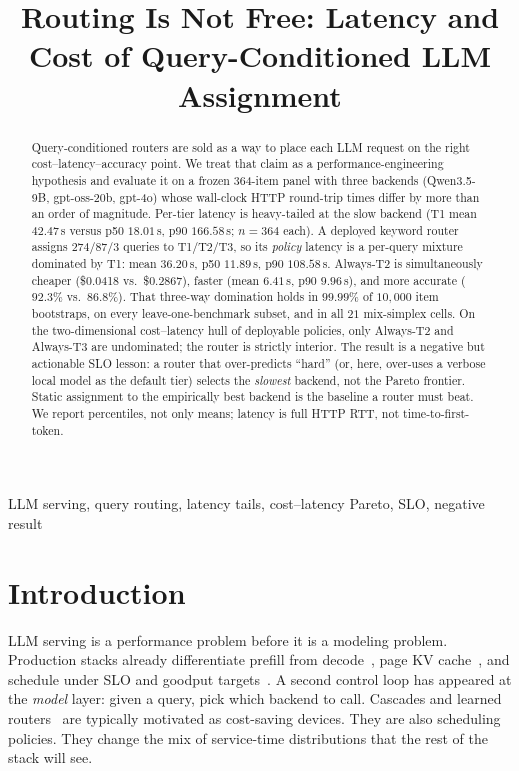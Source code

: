 \documentclass[10pt,conference]{IEEEtran}
\begin{document}
\title{Routing Is Not Free: Latency and Cost of Query-Conditioned LLM Assignment}

\author{
}

\maketitle

\begin{abstract}
Query-conditioned routers are sold as a way to place each LLM request on the right cost--latency--accuracy point. We treat that claim as a performance-engineering hypothesis and evaluate it on a frozen 364-item panel with three backends (Qwen3.5-9B, gpt-oss-20b, gpt-4o) whose wall-clock HTTP round-trip times differ by more than an order of magnitude. Per-tier latency is heavy-tailed at the slow backend (T1 mean $42.47$\,s versus p50 $18.01$\,s, p90 $166.58$\,s; $n{=}364$ each). A deployed keyword router assigns $274/87/3$ queries to T1/T2/T3, so its \emph{policy} latency is a per-query mixture dominated by T1: mean $36.20$\,s, p50 $11.89$\,s, p90 $108.58$\,s. Always-T2 is simultaneously cheaper (\$0.0418 vs.\ \$0.2867), faster (mean $6.41$\,s, p90 $9.96$\,s), and more accurate ($92.3\%$ vs.\ $86.8\%$). That three-way domination holds in $99.99\%$ of $10{,}000$ item bootstraps, on every leave-one-benchmark subset, and in all $21$ mix-simplex cells. On the two-dimensional cost--latency hull of deployable policies, only Always-T2 and Always-T3 are undominated; the router is strictly interior. The result is a negative but actionable SLO lesson: a router that over-predicts ``hard'' (or, here, over-uses a verbose local model as the default tier) selects the \emph{slowest} backend, not the Pareto frontier. Static assignment to the empirically best backend is the baseline a router must beat. We report percentiles, not only means; latency is full HTTP RTT, not time-to-first-token.
\end{abstract}

\begin{IEEEkeywords}
LLM serving, query routing, latency tails, cost--latency Pareto, SLO, negative result
\end{IEEEkeywords}

\section{Introduction}

LLM serving is a performance problem before it is a modeling problem. Production stacks already differentiate prefill from decode~\cite{yu2022orca,zhong2024distserve,patel2024splitwise}, page KV cache~\cite{kwon2023vllm}, and schedule under SLO and goodput targets~\cite{agrawal2024sarathi,sun2024llumnix}. A second control loop has appeared at the \emph{model} layer: given a query, pick which backend to call. Cascades and learned routers~\cite{chen2023frugalgpt,ding2024hybridllm,ong2024routellm} are typically motivated as cost-saving devices. They are also scheduling policies. They change the mix of service-time distributions that the rest of the stack will see.
\end{document}
